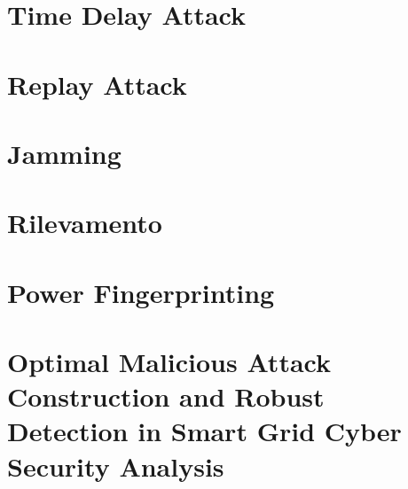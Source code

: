 \section{Time Delay Attack}
\section{Replay Attack}
\section{Jamming}
\section{Rilevamento}
\section{Power Fingerprinting}
\section{Optimal Malicious Attack Construction and Robust Detection in Smart Grid Cyber Security Analysis}



